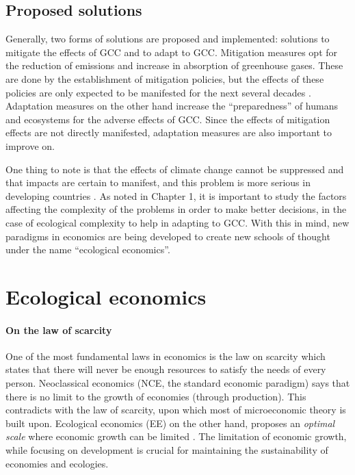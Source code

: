 \subsection{Proposed solutions}
Generally, two forms of solutions are proposed and implemented: solutions to mitigate the effects of GCC and to adapt to GCC.
Mitigation measures opt for the reduction of emissions and increase in absorption of greenhouse gases.
These are done by the establishment of mitigation policies, but the effects of these policies are only expected to be manifested for the next several decades \cite{overclim}.
Adaptation measures on the other hand increase the ``preparedness'' of humans and ecosystems for the adverse effects of GCC.
Since the effects of mitigation effects are not directly manifested, adaptation measures are also important to improve on.

One thing to note is that the effects of climate change cannot be suppressed and that impacts are certain to manifest, and this problem is more serious in developing countries \cite{overclim, introclim}.
As noted in Chapter 1, it is important to study the factors affecting the complexity of the problems in order to make better decisions, in the case of ecological complexity to help in adapting to GCC.
With this in mind, new paradigms in economics are being developed to create new schools of thought under the name ``ecological economics''.

\section{Ecological economics}
\paragraph{On the law of scarcity}
One of the most fundamental laws in economics is the law on scarcity which states that there will never be enough resources to satisfy the needs of every person.
Neoclassical economics (NCE, the standard economic paradigm) says that there is no limit to the growth of economies (through production).
This contradicts with the law of scarcity, upon which most of microeconomic theory is built upon.
Ecological economics (EE) on the other hand, proposes an \emph{optimal scale} where economic growth can be limited \cite[p.15-18]{daly}.
The limitation of economic growth, while focusing on development is crucial for maintaining the sustainability of economies and ecologies.

